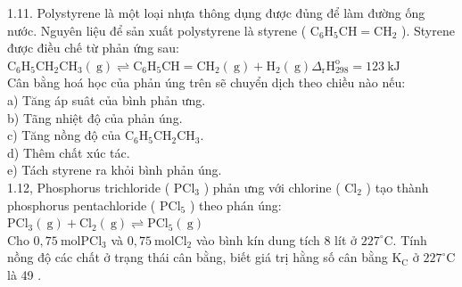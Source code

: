 \documentclass[10pt]{article}
\begin{document}
1.11. Polystyrene là một loại nhựa thông dụng được đủng để làm đường ống nước. Nguyên liệu để sản xuất polystyrene là styrene ( $\mathrm{C}_{6} \mathrm{H}_{5} \mathrm{CH}=\mathrm{CH}_{2}$ ). Styrene được điều chế từ phản ứng sau:\\
$\mathrm{C}_{6} \mathrm{H}_{5} \mathrm{CH}_{2} \mathrm{CH}_{3}(\mathrm{~g}) \rightleftharpoons \mathrm{C}_{6} \mathrm{H}_{5} \mathrm{CH}=\mathrm{CH}_{2}(\mathrm{~g})+\mathrm{H}_{2}(\mathrm{~g}) \Delta_{\mathrm{r}} \mathrm{H}_{298}^{\mathrm{o}}=123 \mathrm{~kJ}$\\
Cân bằng hoá học của phản úng trên sẽ chuyển dịch theo chiều nào nếu:\\
a) Tăng áp suât của bình phản ưng.\\
b) Tãng nhiệt độ của phản úng.\\
c) Tăng nồng độ của $\mathrm{C}_{6} \mathrm{H}_{5} \mathrm{CH}_{2} \mathrm{CH}_{3}$.\\
d) Thêm chất xúc tác.\\
e) Tách styrene ra khỏi bình phản úng.\\
1.12, Phosphorus trichloride ( $\mathrm{PCl}_{3}$ ) phản ưng với chlorine ( $\mathrm{Cl}_{2}$ ) tạo thành phosphorus pentachloride ( $\mathrm{PCl}_{5}$ ) theo phán úng:\\
$\mathrm{PCl}_{3}(\mathrm{~g})+\mathrm{Cl}_{2}(\mathrm{~g}) \rightleftharpoons \mathrm{PCl}_{5}(\mathrm{~g})$\\
Cho $0,75 \mathrm{~mol} \mathrm{PCl}_{3}$ và $0,75 \mathrm{~mol} \mathrm{Cl}_{2}$ vào bình kín dung tích 8 lít ở $227^{\circ} \mathrm{C}$. Tính nồng độ các chất ở trạng thái cân bằng, biết giá trị hằng số cân bằng $\mathrm{K}_{\mathrm{C}}$ ở $227^{\circ} \mathrm{C}$ là 49 .
\end{document}
